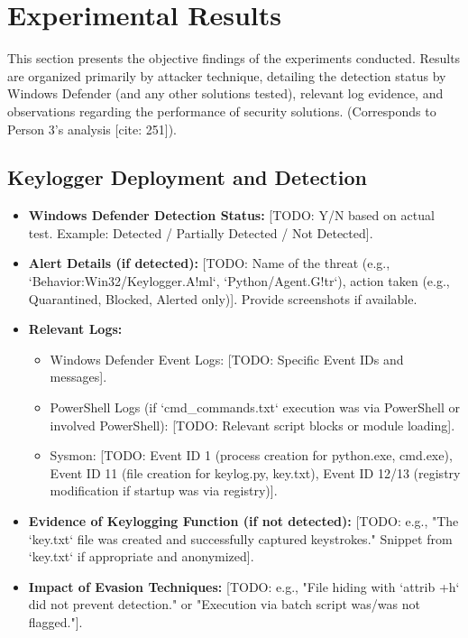 \documentclass[11pt]{article}
\begin{document}
	\section{Experimental Results}
	This section presents the objective findings of the experiments conducted. Results are organized primarily by attacker technique, detailing the detection status by Windows Defender (and any other solutions tested), relevant log evidence, and observations regarding the performance of security solutions. (Corresponds to Person 3's analysis [cite: 251]).
	
	\subsection{Keylogger Deployment and Detection}
	\begin{itemize}
		\item \textbf{Windows Defender Detection Status:} [TODO: Y/N based on actual test. Example: Detected / Partially Detected / Not Detected].
		\item \textbf{Alert Details (if detected):} [TODO: Name of the threat (e.g., `Behavior:Win32/Keylogger.A!ml`, `Python/Agent.G!tr`), action taken (e.g., Quarantined, Blocked, Alerted only)]. Provide screenshots if available.
		\item \textbf{Relevant Logs:}
		\begin{itemize}
			\item Windows Defender Event Logs: [TODO: Specific Event IDs and messages].
			\item PowerShell Logs (if `cmd_commands.txt` execution was via PowerShell or involved PowerShell): [TODO: Relevant script blocks or module loading].
			\item Sysmon: [TODO: Event ID 1 (process creation for python.exe, cmd.exe), Event ID 11 (file creation for keylog.py, key.txt), Event ID 12/13 (registry modification if startup was via registry)].
		\end{itemize}
		\item \textbf{Evidence of Keylogging Function (if not detected):} [TODO: e.g., "The `key.txt` file was created and successfully captured keystrokes." Snippet from `key.txt` if appropriate and anonymized].
		\item \textbf{Impact of Evasion Techniques:} [TODO: e.g., "File hiding with `attrib +h` did not prevent detection." or "Execution via batch script was/was not flagged."].
	\end{itemize}
	
\end{document}

